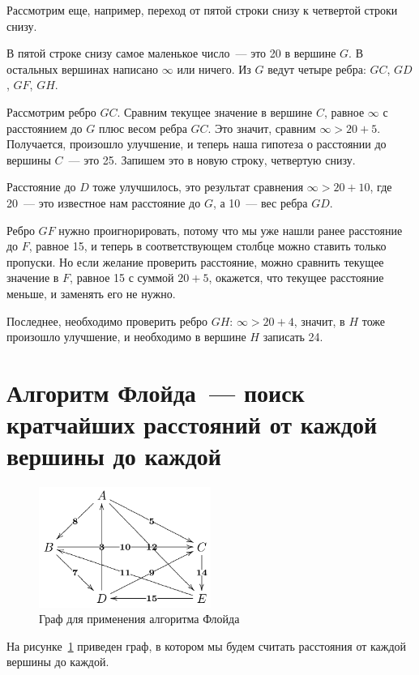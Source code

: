 \documentclass{article}
\begin{document}
Рассмотрим еще, например, переход от пятой строки снизу к четвертой строки снизу.

В пятой строке снизу самое маленькое число~--- это 20 в вершине $G$. В остальных вершинах написано $\infty$ или ничего. Из $G$ ведут четыре ребра: $GC$, $GD$, $GF$, $GH$.

Рассмотрим ребро $GC$. Сравним текущее значение в вершине $C$, равное $\infty$ с расстоянием до $G$ плюс весом ребра $GC$. Это значит, сравним $\infty > 20 + 5$. Получается, произошло улучшение, и теперь наша гипотеза о расстоянии до вершины $C$~--- это 25. Запишем это в новую строку, четвертую снизу.

Расстояние до $D$ тоже улучшилось, это результат сравнения $\infty > 20 + 10$, где 20~--- это известное нам расстояние до $G$, а 10~--- вес ребра $GD$.

Ребро $GF$ нужно проигнорировать, потому что мы уже нашли ранее расстояние до $F$, равное 15, и теперь в соответствующем столбце можно ставить только пропуски. Но если желание проверить расстояние, можно сравнить текущее значение в $F$, равное 15 с суммой $20 + 5$, окажется, что текущее расстояние меньше, и заменять его не нужно.

Последнее, необходимо проверить ребро $GH$: $\infty > 20 + 4$, значит, в $H$ тоже произошло улучшение, и необходимо в вершине $H$ записать 24.

\section{Алгоритм Флойда~--- поиск кратчайших расстояний от каждой вершины до каждой}

\begin{figure}
	\begin{center}
		\includegraphics[width=0.5\textwidth]{floyd-statement.png}
	\end{center}
	\caption{Граф для применения алгоритма Флойда}
	\label{fig:floyd-statement}
\end{figure}

На рисунке~\ref{fig:floyd-statement} приведен граф, в котором мы будем считать расстояния от каждой вершины до каждой.
\end{document}
